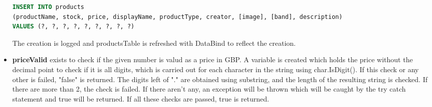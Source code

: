 ﻿\documentclass{article}
\begin{document}
\begin{itemize}
\begin{lstlisting}[language=SQL]
INSERT INTO products
(productName, stock, price, displayName, productType, creator, [image], [band], description)
VALUES (?, ?, ?, ?, ?, ?, ?, ?, ?)
        \end{lstlisting}
        The creation is logged and productsTable is refreshed with DataBind to reflect the creation.
        \item \textbf{priceValid} exists to check if the given number is valud as a price in GBP.
        A variable is created which holds the price without the decimal point to check if it is all digits, which is carried out for each character in the string using char.IsDigit().
        If this check or any other is failed, "false" is returned.
        The digits left of "." are obtained using substring, and the length of the resulting string is checked.
        If there are more than 2, the check is failed.
        If there aren't any, an exception will be thrown which will be caught by the try catch statement and true will be returned.
        If all these checks are passed, true is returned.
    \end{itemize}
\end{document}
